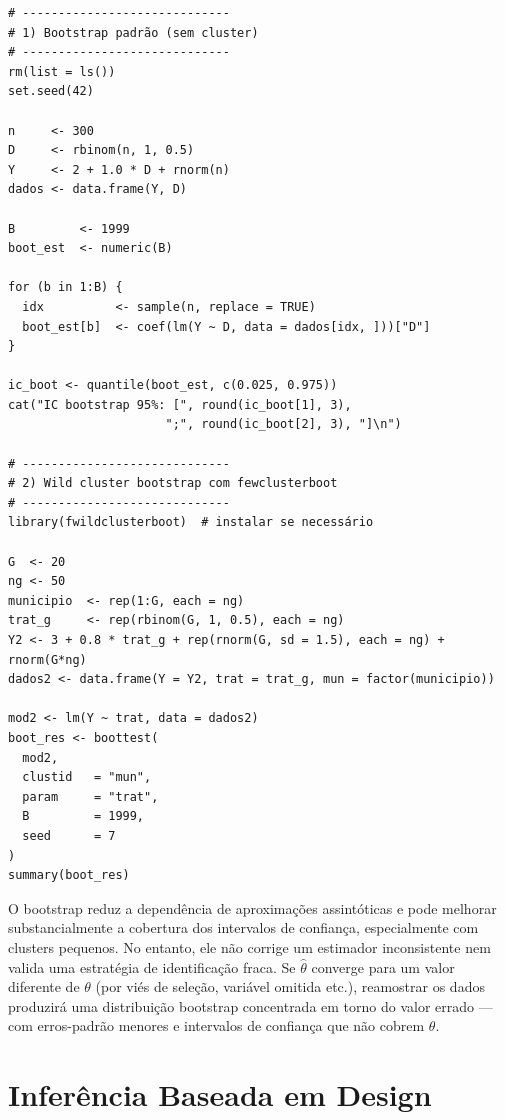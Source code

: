 \begin{lstlisting}[style=Rstyle, caption={Bootstrap e wild cluster bootstrap em R}]
# -----------------------------
# 1) Bootstrap padrão (sem cluster)
# -----------------------------
rm(list = ls())
set.seed(42)

n     <- 300
D     <- rbinom(n, 1, 0.5)
Y     <- 2 + 1.0 * D + rnorm(n)
dados <- data.frame(Y, D)

B         <- 1999
boot_est  <- numeric(B)

for (b in 1:B) {
  idx          <- sample(n, replace = TRUE)
  boot_est[b]  <- coef(lm(Y ~ D, data = dados[idx, ]))["D"]
}

ic_boot <- quantile(boot_est, c(0.025, 0.975))
cat("IC bootstrap 95%: [", round(ic_boot[1], 3),
                      ";", round(ic_boot[2], 3), "]\n")

# -----------------------------
# 2) Wild cluster bootstrap com fewclusterboot
# -----------------------------
library(fwildclusterboot)  # instalar se necessário

G  <- 20
ng <- 50
municipio  <- rep(1:G, each = ng)
trat_g     <- rep(rbinom(G, 1, 0.5), each = ng)
Y2 <- 3 + 0.8 * trat_g + rep(rnorm(G, sd = 1.5), each = ng) + rnorm(G*ng)
dados2 <- data.frame(Y = Y2, trat = trat_g, mun = factor(municipio))

mod2 <- lm(Y ~ trat, data = dados2)
boot_res <- boottest(
  mod2,
  clustid   = "mun",
  param     = "trat",
  B         = 1999,
  seed      = 7
)
summary(boot_res)
\end{lstlisting}

\begin{atencaobox}
O bootstrap reduz a dependência de aproximações assintóticas e pode melhorar substancialmente a cobertura dos intervalos de confiança, especialmente com clusters pequenos. No entanto, ele não corrige um estimador inconsistente nem valida uma estratégia de identificação fraca. Se $\hat{\theta}$ converge para um valor diferente de $\theta$ (por viés de seleção, variável omitida etc.), reamostrar os dados produzirá uma distribuição bootstrap concentrada em torno do valor errado — com erros-padrão menores e intervalos de confiança que não cobrem $\theta$.
\end{atencaobox}


\section{Inferência Baseada em Design}
\label{sec:design_based}

